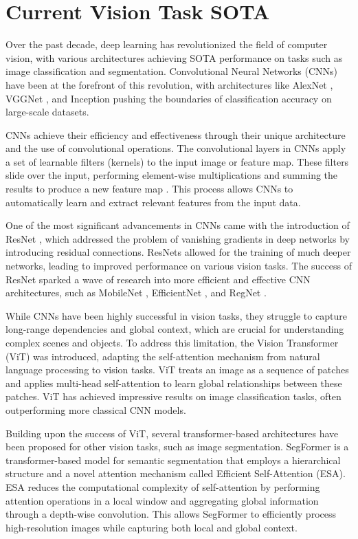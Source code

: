 \documentclass[conference]{IEEEtran}
\begin{document}
\section{Current Vision Task SOTA}
Over the past decade, deep learning has revolutionized the field of computer vision, with various architectures achieving SOTA performance on tasks such as image classification and segmentation. Convolutional Neural Networks (CNNs)\cite{lecundocument} have been at the forefront of this revolution, with architectures like AlexNet \cite{krizhevsky2012imagenet}, VGGNet \cite{simonyan2014very}, and Inception \cite{szegedy2015going} pushing the boundaries of classification accuracy on large-scale datasets.

CNNs achieve their efficiency and effectiveness through their unique architecture and the use of convolutional operations. The convolutional layers in CNNs apply a set of learnable filters (kernels) to the input image or feature map. These filters slide over the input, performing element-wise multiplications and summing the results to produce a new feature map \cite{lecundocument}. This process allows CNNs to automatically learn and extract relevant features from the input data.

One of the most significant advancements in CNNs came with the introduction of ResNet \cite{he2016deep}, which addressed the problem of vanishing gradients in deep networks by introducing residual connections. ResNets allowed for the training of much deeper networks, leading to improved performance on various vision tasks. The success of ResNet sparked a wave of research into more efficient and effective CNN architectures, such as MobileNet \cite{howard2017mobilenets}, EfficientNet \cite{tan2019efficientnet}, and RegNet \cite{radosavovic2020designing}.

While CNNs have been highly successful in vision tasks, they struggle to capture long-range dependencies and global context, which are crucial for understanding complex scenes and objects. To address this limitation, the Vision Transformer (ViT) \cite{dosovitskiy2021image} was introduced, adapting the self-attention mechanism from natural language processing to vision tasks. ViT treats an image as a sequence of patches and applies multi-head self-attention to learn global relationships between these patches. ViT has achieved impressive results on image classification tasks, often outperforming more classical CNN models.

Building upon the success of ViT, several transformer-based architectures have been proposed for other vision tasks, such as image segmentation. SegFormer \cite{xie2021segformer} is a transformer-based model for semantic segmentation that employs a hierarchical structure and a novel attention mechanism called Efficient Self-Attention (ESA). ESA reduces the computational complexity of self-attention by performing attention operations in a local window and aggregating global information through a depth-wise convolution. This allows SegFormer to efficiently process high-resolution images while capturing both local and global context.
\end{document}
